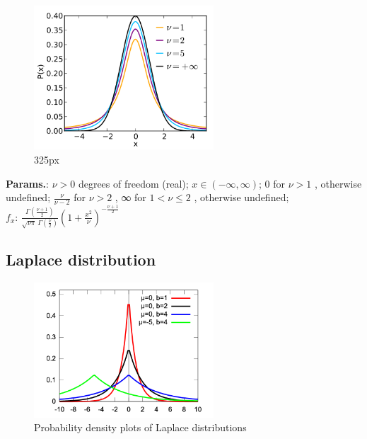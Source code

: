     \begin{figure}[H]
        \centering
        \includegraphics[width=0.6\textwidth]{images/student t pdf.png}
        \caption{325px}
    \end{figure}




    {\color{darkblue} \textbf{Params.}:} {$\nu > 0$ degrees of freedom (real)}; {$x \in (- \infty, \infty)$}; {0 for $\nu > 1$ , otherwise undefined}; {$\textstyle\frac{\nu}{\nu-2}$ for $\nu > 2$ , ∞ for $1 < \nu \le 2$ , otherwise undefined};\hspace{0.5cm}\\{\color{darkblue} \textbf{$f_x$}:} {$\textstyle\frac{\Gamma \left(\frac{\nu+1}{2} \right)} {\sqrt{\nu\pi}\,\Gamma \left(\frac{\nu}{2} \right)} \left(1+\frac{x^2}{\nu} \right)^{-\frac{\nu+1}{2}}\!$}



    
        
\subsection{Laplace distribution}


    \begin{figure}[H]
        \centering
        \includegraphics[width=0.6\textwidth]{images/Laplace pdf mod.png}
        \caption{Probability density plots of Laplace distributions}
    \end{figure}




